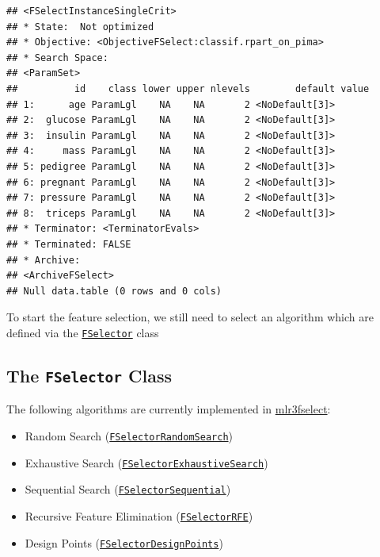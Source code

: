 \documentclass[
]{scrbook}
\providecommand{\tightlist}{%
  \setlength{\itemsep}{0pt}\setlength{\parskip}{0pt}}
\begin{document}
\begin{verbatim}
## <FSelectInstanceSingleCrit>
## * State:  Not optimized
## * Objective: <ObjectiveFSelect:classif.rpart_on_pima>
## * Search Space:
## <ParamSet>
##          id    class lower upper nlevels        default value
## 1:      age ParamLgl    NA    NA       2 <NoDefault[3]>      
## 2:  glucose ParamLgl    NA    NA       2 <NoDefault[3]>      
## 3:  insulin ParamLgl    NA    NA       2 <NoDefault[3]>      
## 4:     mass ParamLgl    NA    NA       2 <NoDefault[3]>      
## 5: pedigree ParamLgl    NA    NA       2 <NoDefault[3]>      
## 6: pregnant ParamLgl    NA    NA       2 <NoDefault[3]>      
## 7: pressure ParamLgl    NA    NA       2 <NoDefault[3]>      
## 8:  triceps ParamLgl    NA    NA       2 <NoDefault[3]>      
## * Terminator: <TerminatorEvals>
## * Terminated: FALSE
## * Archive:
## <ArchiveFSelect>
## Null data.table (0 rows and 0 cols)
\end{verbatim}

To start the feature selection, we still need to select an algorithm which are defined via the \href{https://mlr3fselect.mlr-org.com/reference/FSelector.html}{\texttt{FSelector}} class

\hypertarget{the-fselector-class}{%
\subsection{\texorpdfstring{The \texttt{FSelector} Class}{The FSelector Class}}\label{the-fselector-class}}

The following algorithms are currently implemented in \href{https://mlr3fselect.mlr-org.com}{mlr3fselect}:

\begin{itemize}
\tightlist
\item
  Random Search (\href{https://mlr3fselect.mlr-org.com/reference/FSelectorRandomSearch.html}{\texttt{FSelectorRandomSearch}})
\item
  Exhaustive Search (\href{https://mlr3fselect.mlr-org.com/reference/FSelectorExhaustiveSearch.html}{\texttt{FSelectorExhaustiveSearch}})
\item
  Sequential Search (\href{https://mlr3fselect.mlr-org.com/reference/FSelectorSequential.html}{\texttt{FSelectorSequential}})
\item
  Recursive Feature Elimination (\href{https://mlr3fselect.mlr-org.com/reference/FSelectorRFE.html}{\texttt{FSelectorRFE}})
\item
  Design Points (\href{https://mlr3fselect.mlr-org.com/reference/FSelectorDesignPoints.html}{\texttt{FSelectorDesignPoints}})
\end{itemize}
\end{document}
